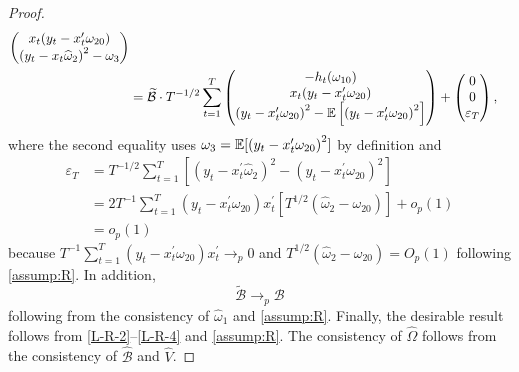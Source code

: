 \documentclass[11pt, letterpaper, twoside]{article}
\begin{document}
\begin{appendices}
\begin{proof}
\begin{align}
\begin{pmatrix}
%
        x_{t}(y_{t}-x_{t}^{\prime }\omega _{20}) \\ 
%
        \left( y_{t}-x_{t}\widehat{\omega }_{2}\right) ^{2}-\omega _{3}%
    \end{pmatrix}  \nonumber \\
%
    &=
%
    \widetilde{\mathcal{B}}\cdot T^{-1/2}\sum_{t=1}^{T} 
%
    \begin{pmatrix}
        -h_{t}(\omega _{10}) \\ 
%
        x_{t}(y_{t}-x_{t}^{\prime }\omega _{20}) \\ 
%
        \left( y_{t}-x_{t}^{\prime }\omega _{20}\right) ^{2}-\E\left[\left( y_{t}-x_{t}^{\prime }\omega _{20}\right)^{2}\right]%
%
    \end{pmatrix}%
%
    +
%
    \begin{pmatrix}
        0 \\ 
        0 \\ 
        \varepsilon_{T}
    \end{pmatrix},
%
    \label{L-R-2}
%
\end{align}%
%
where the second equality uses $\omega _{3}=\operatorname{\mathbb{E}}[\left( y_{t}-x_{t}^{\prime }\omega _{20}\right) ^{2}]$ by definition and 
%
\begin{align}
    \varepsilon _{T} 
%
    &= T^{-1/2}\sum_{t=1}^{T}\left[ \left( y_{t}-x_{t}^{\prime } \widehat{\omega }_{2}\right) ^{2}-\left( y_{t}-x_{t}^{\prime }\omega _{20}\right) ^{2}\right]  \nonumber \\
%
    &= 2T^{-1}\sum_{t=1}^{T}\left( y_{t}-x_{t}^{\prime }\omega _{20}\right) x_{t}^{\prime }\left[ T^{1/2}\left( \widehat{\omega }_{2}-\omega _{20}\right) \right] +o_{p}(1)  \nonumber \\
%
    &= o_{p}(1)  
%
    \label{L-R-3}
\end{align}
%
%
because $T^{-1}\sum_{t=1}^{T}\left( y_{t}-x_{t}^{\prime }\omega _{20}\right) x_{t}^{\prime }\rightarrow _{p}0$ and $T^{1/2}(\widehat{\omega }_{2}-\omega _{20})=O_{p}(1)$ following \cref{assump:R}. 
In addition, 
%
\begin{equation}
    \widetilde{\mathcal{B}}\rightarrow _{p}\mathcal{B}  
    \label{L-R-4}
\end{equation}%
%
%
following from the consistency of $\widehat{\omega}_{1}$ and \cref{assump:R}.  Finally, the desirable result follows from \cref{L-R-2}--\cref{L-R-4} and \cref{assump:R}.  The consistency of $\widehat{\Omega }$ follows from the consistency of $\widehat{\mathcal{B}}$ and $\widehat{V}$. 

\end{proof}


\end{appendices}
\end{document}
